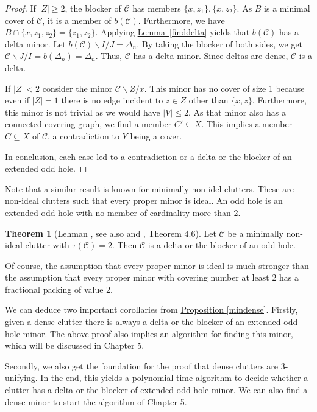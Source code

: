 \documentclass[a4paper, 12pt]{scrbook}
\theoremstyle{definition}
\newtheorem{theorem}{Theorem}[chapter]
\begin{document}
\begin{proof}
       If $|Z|\geq 2$, the blocker of $\mathcal{C}$ has members $\{x,z_1\},\{x,z_2\}$.
       As $B$ is a minimal cover of $\mathcal{C}$, it is a member of $b(\mathcal{C})$.
       Furthermore, we have $B \cap \{x,z_1,z_2\}=\{z_1,z_2\}$.
       Applying \hyperref[finddelta]{Lemma~\ref*{finddelta}} yields that $b(\mathcal{C})$ has a delta minor.
       Let $b(\mathcal{C})\backslash I /J=\Delta_n$.
       By taking the blocker of both sides, we get $\mathcal{C} \backslash J / I = b(\Delta_n)=\Delta_n$.
       Thus, $\mathcal{C}$ has a delta minor. Since deltas are dense, $\mathcal{C}$ is a delta.

       If $|Z|<2$ consider the minor $\mathcal{C}\backslash Z /x$.
       This minor has no cover of size 1 because even if $|Z|=1$ there is no edge incident to $z \in Z$ other than $\{x,z\}$.
       Furthermore, this minor is not trivial as we would have $|V|\leq 2$.
       As that minor also has a connected covering graph, we find a member $C' \subseteq X$.
       This implies a member $C \subseteq X$ of $\mathcal{C}$, a contradiction to $Y$ being a cover.

       In conclusion, each case led to a contradiction or a delta or the blocker of an extended odd hole.
   \end{proof}

   Note that a similar result is known for minimally non-idel clutters.
   These are non-ideal clutters such that every proper minor is ideal.
   An odd hole is an extended odd hole with no member of cardinality more than 2.
   \begin{theorem}[Lehman \cite{lehman}, see also \cite{seymour} and \cite{ideal}, Theorem 4.6]
       Let $\mathcal{C}$ be a minimally non-ideal clutter with $\tau(\mathcal{C})=2$. Then $\mathcal{C}$ is a delta or the blocker of an odd hole.
   \end{theorem}

   Of course, the assumption that every proper minor is ideal is much stronger than the assumption that every proper minor with covering number at least 2 has a fractional packing of value 2.

   We can deduce two important corollaries from \hyperref[mindense]{Proposition \ref*{mindense}}. Firstly, given a dense clutter there is always a delta or the blocker of an extended odd hole minor. The above proof also implies an algorithm for finding this minor, which will be discussed in Chapter 5.

   Secondly, we also get the foundation for the proof that dense clutters are 3-unifying. In the end, this yields a polynomial time algorithm to decide whether a clutter has a delta or the blocker of extended odd hole minor. We can also find a dense minor to start the algorithm of Chapter 5.
\end{document}
